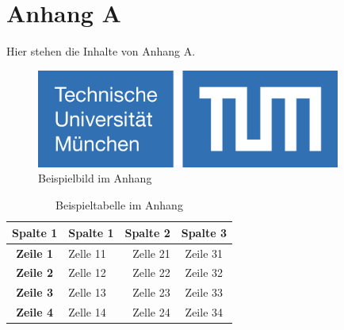 \chapter{Anhang A}
\label{cha:anhang_A}

\renewcommand*{\thepage}{A-\arabic{page}} %

Hier stehen die Inhalte von Anhang A.

\begin{figure}[htbp] 
	\centering
	\includegraphics[width=10cm]{./figures/logotum_neu.png}
	\caption{Beispielbild im Anhang}
	\label{fig:beispielbild_anhang}
\end{figure}

\begin{table}[htbp]
    \centering
    \caption{Beispieltabelle im Anhang}
    \footnotesize
    \begin{tabularx}{0.83\textwidth} {cL{0.5}R{0.5}C{2}} %
        \toprule
        \textbf{Spalte 1} & Spalte 1 &Spalte 2 &Spalte 3 \\ \midrule %
        \textbf{Zeile 1} & Zelle 11 & Zelle 21 & Zeile 31 \\
        \textbf{Zeile 2} & Zelle 12 & Zelle 22 & Zeile 32 \\
        \textbf{Zeile 3} & Zelle 13 & Zelle 23 & Zeile 33 \\ 
        \textbf{Zeile 4} & Zelle 14 & Zelle 24 & Zeile 34 \\ \bottomrule
    \end{tabularx}
    \label{tab:beispieltabelle_anhang}
\end{table}
